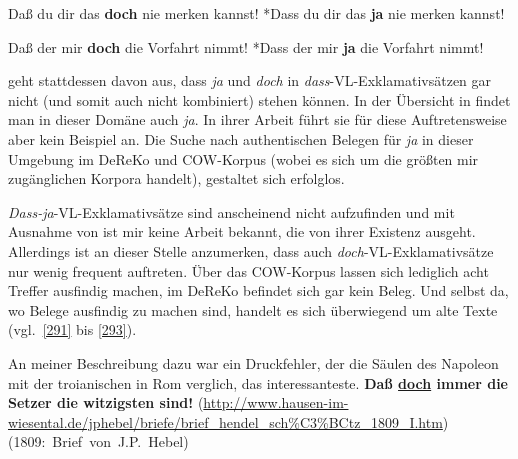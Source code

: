 \begin{exe}
	\ex\label{289} 
		\begin{xlist}	
			\ex\label{289a} Daß du dir das \textbf{doch} nie merken kannst!
			\hfill\hbox{\citet[56]{Thurmair1989}}
			\ex\label{289b} *Dass du dir das \textbf{ja} nie merken kannst!
		\end{xlist}
\end{exe}

\begin{exe}
	\ex\label{290} 
		\begin{xlist}	
			\ex\label{290a} Daß der mir \textbf{doch} die Vorfahrt nimmt!
			\ex\label{290b} *Dass der mir \textbf{ja} die Vorfahrt nimmt!
			\hfill\hbox{\citet[152]{Zaefferer1988}}
		\end{xlist}
\end{exe}
\citet[40--41]{Altmann1987} geht stattdessen davon aus, dass \textit{ja} und \textit{doch} in \textit{dass}-VL-Exklamativsätzen  gar nicht (und somit auch nicht kombiniert) stehen können. In der Übersicht in \citet[59]{Karagjosova2004} findet man in dieser Domäne auch \textit{ja}. In ihrer Arbeit führt sie für diese Auftretensweise aber kein Beispiel an. Die Suche nach authentischen Belegen für \textit{ja} in dieser Umgebung im DeReKo und COW-Korpus (wobei es sich um die größten mir zugänglichen Korpora handelt), gestaltet sich erfolglos.

\textit{Dass-ja}-VL-Exklamativsätze sind anscheinend nicht aufzufinden und mit Ausnahme von \citet{Karagjosova2004} ist mir keine Arbeit bekannt, die von ihrer Existenz ausgeht. Allerdings ist an dieser Stelle anzumerken, dass auch \textit{doch}-VL-Exklamativsätze nur wenig frequent auftreten. Über das COW-Korpus lassen sich lediglich acht Treffer ausfindig machen, im DeReKo befindet sich gar kein Beleg. Und selbst da, wo Belege ausfindig zu machen sind, handelt es sich überwiegend um alte Texte (vgl.\ \ref{291} bis \ref{293}).
 
\begin{exe}
	\ex\label{291} 

		An meiner Beschreibung dazu war ein Druckfehler, der die Säulen des Napoleon mit der troianischen in Rom verglich, das interessanteste. 					\textbf{Daß \underline{doch} immer die Setzer die witzigsten sind!}
			\newline
			{\scriptsize(\url{http://www.hausen-im-wiesental.de/jphebel/briefe/brief\_hendel\_sch\%C3\%BCtz\_1809\_I.htm})}
			\newline
			\hbox{}\hfill\hbox{(1809: Brief von J.P. Hebel)}	
\end{exe}

